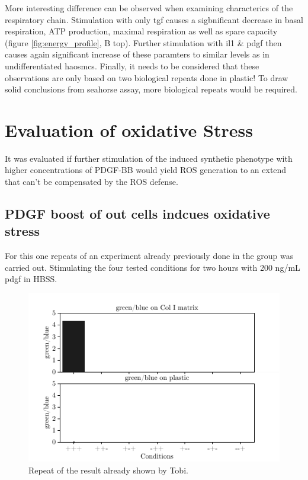     More interesting difference can be observed when examining characterics of the respiratory chain. Stimulation with only \ac{tgf} causes a sigbnificant decrease in basal respiration, ATP production, maximal respiration as well as spare capacity (figure \ref{fig:energy_profile}, B top). Further stimulation with \ac{il1} \& \ac{pdgf} then causes again significant increase of these paramters to similar levels as in undifferentiated \acp{haosmc}. Finally, it needs to be considered that these observations are only based on two biological repeats done in plastic! To draw solid conclusions from seahorse assay, more biological repeats would be required.

\section{Evaluation of oxidative Stress}
\label{sec:oxStress}
It was evaluated if further stimulation of the induced synthetic phenotype with higher concentrations of PDGF-BB would yield ROS generation to an extend that can't be compensated by the ROS defense.

    \subsection{PDGF boost of out cells indcues oxidative stress}
    For this one repeats of an experiment already previously done in the group was carried out. Stimulating the four tested conditions for two hours with 200 ng/mL \ac{pdgf} in HBSS.

    \begin{figure}[h]
    \capstart
        \centering
    	\includegraphics{Abbildung/CellROX_initial_cond.pdf}

    	\begin{minipage}{\captionwidth}
    		\caption[repeat_Lisa]{ \newline Repeat of the result already shown by Tobi.}
    		\label{fig:cellrox_8con}
    	\end{minipage}
    \end{figure}

